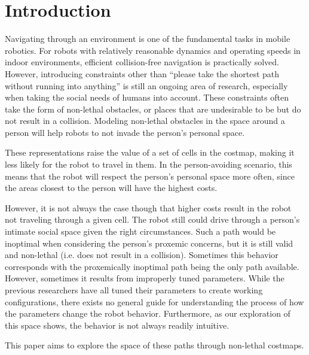 \section{Introduction}
Navigating through an environment is one of the fundamental tasks in mobile robotics. For robots with relatively reasonable dynamics and operating speeds in indoor environments, efficient collision-free navigation is practically solved. However, introducing constraints other than ``please take the shortest path without running into anything'' is still an ongoing area of research, especially when taking the social needs of humans into account. These constraints often take the form of non-lethal obstacles, or places that are undesirable to be but do not result in a collision. Modeling non-lethal obstacles in the space around a person will help robots to not invade the person's personal space. 

These representations raise the value of a set of cells in the costmap, making it less likely for the robot to travel in them. In the person-avoiding scenario, this means that the robot will respect the person's personal space more often, since the areas closest to the person will have the highest costs.

However, it is not always the case though that higher costs result in the robot not traveling through a given cell. The robot still could drive through a person's intimate social space given the right circumstances. Such a path would be inoptimal when considering the person's proxemic concerns, but it is still valid and non-lethal (i.e. does not result in a collision). Sometimes this behavior corresponds with the proxemically inoptimal path being the only path available. However, sometimes it results from improperly tuned parameters. While the previous researchers have all tuned their parameters to create working configurations, there exists no general guide for understanding the process of how the parameters change the robot behavior. Furthermore, as our exploration of this space shows, the behavior is not always readily intuitive. 

This paper aims to explore the space of these paths through non-lethal costmaps. 


